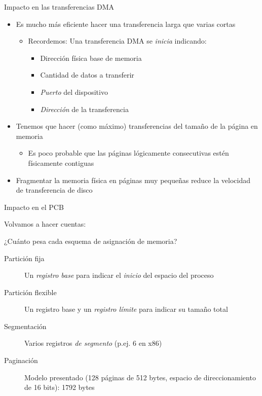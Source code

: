 \documentclass[presentation]{beamer}
\begin{document}
\begin{frame}[label={sec:org4eeabea}]{Impacto en las transferencias DMA}
\begin{itemize}
\item Es mucho más eficiente hacer una transferencia larga que varias
cortas
\begin{itemize}
\item Recordemos: Una transferencia DMA se \emph{inicia} indicando:
\begin{itemize}
\item Dirección física base de memoria
\item Cantidad de datos a transferir
\item \emph{Puerto} del dispositivo
\item \emph{Dirección} de la transferencia
\end{itemize}
\end{itemize}
\item Tenemos que hacer (como máximo) transferencias del tamaño de la
página en memoria
\begin{itemize}
\item Es poco probable que las páginas lógicamente consecutivas estén
físicamente contiguas
\end{itemize}
\item Fragmentar la memoria física en páginas muy pequeñas reduce la
velocidad de transferencia de disco
\end{itemize}
\end{frame}

\begin{frame}[label={sec:org5c0f958}]{Impacto en el PCB}
\begin{center}
Volvamos a hacer cuentas:

¿Cuánto pesa cada esquema de asignación de memoria?
\end{center}
\begin{description}
\item[{Partición fija}] Un \emph{registro base} para indicar el \emph{inicio} del
espacio del proceso
\item[{Partición flexible}] Un registro base y un \emph{registro límite} para
indicar su tamaño total
\item[{Segmentación}] Varios registros \emph{de segmento} (p.ej. 6 en x86)
\item[{Paginación}] Modelo presentado (128 páginas de 512 bytes, espacio
de direccionamiento de 16 bits): 1792 bytes
\end{description}
\end{frame}
\end{document}
